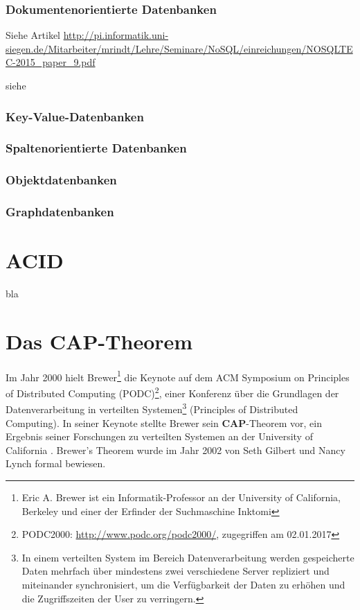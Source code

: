 \subsubsection{Dokumentenorientierte Datenbanken}

Siehe Artikel \url{http://pi.informatik.uni-siegen.de/Mitarbeiter/mrindt/Lehre/Seminare/NoSQL/einreichungen/NOSQLTEC-2015_paper_9.pdf}

siehe \cite[S. 5-8]{Edlich.2011}
\subsubsection{Key-Value-Datenbanken}
\subsubsection{Spaltenorientierte Datenbanken}
\subsubsection{Objektdatenbanken}
\subsubsection{Graphdatenbanken}

\section{ACID}
bla

\section{Das CAP-Theorem}


Im Jahr 2000 hielt Brewer\footnote{Eric A. Brewer ist ein Informatik-Professor an der University of California, Berkeley und einer der Erfinder der Suchmaschine Inktomi} die Keynote auf dem ACM Symposium on Principles of Distributed Computing (PODC)\footnote{PODC2000: \url{http://www.podc.org/podc2000/}, zugegriffen am 02.01.2017}, einer Konferenz über die Grundlagen der Datenverarbeitung in verteilten Systemen\footnote{In einem verteilten System im Bereich Datenverarbeitung werden gespeicherte Daten mehrfach über mindestens zwei verschiedene Server repliziert und miteinander synchronisiert, um die Verfügbarkeit der Daten zu erhöhen und die Zugriffszeiten der User zu verringern.} (Principles of Distributed Computing).  In seiner Keynote stellte Brewer sein \textbf{CAP}-Theorem vor, ein Ergebnis seiner Forschungen zu verteilten Systemen an der University of California \cite[S. 13]{Kurowski.2012}. Brewer's Theorem wurde im Jahr 2002 von Seth Gilbert und Nancy Lynch formal bewiesen.

